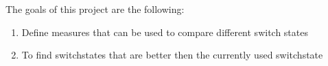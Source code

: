 The goals of this project are the following:

\begin{enumerate}
    \item Define measures that can be used to compare different switch states
    \item To find switchstates that are better then the currently used switchstate
\end{enumerate}

